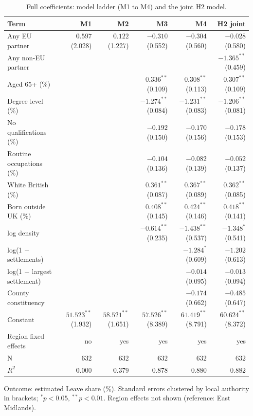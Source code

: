 \documentclass[11pt,a4paper]{article}
\begin{document}
\begin{table}[H]\centering\scriptsize\begin{threeparttable}\caption{Full coefficients: model ladder (M1 to M4) and the joint H2 model.}\label{tab:full}\begin{tabular}{lrrrrr}\toprule Term & M1 & M2 & M3 & M4 & H2 joint\\\midrule
Any EU partner & $0.597$ (2.028) & $0.122$ (1.227) & $-0.310$ (0.552) & $-0.304$ (0.560) & $-0.028$ (0.580)\\
Any non-EU partner &  &  &  &  & $-1.365^{**}$ (0.459)\\
Aged 65+ (\%) &  &  & $0.336^{**}$ (0.109) & $0.308^{**}$ (0.113) & $0.307^{**}$ (0.109)\\
Degree level (\%) &  &  & $-1.274^{**}$ (0.084) & $-1.231^{**}$ (0.083) & $-1.206^{**}$ (0.081)\\
No qualifications (\%) &  &  & $-0.192$ (0.150) & $-0.170$ (0.156) & $-0.178$ (0.153)\\
Routine occupations (\%) &  &  & $-0.104$ (0.136) & $-0.082$ (0.139) & $-0.052$ (0.137)\\
White British (\%) &  &  & $0.361^{**}$ (0.087) & $0.367^{**}$ (0.089) & $0.362^{**}$ (0.085)\\
Born outside UK (\%) &  &  & $0.408^{**}$ (0.145) & $0.424^{**}$ (0.146) & $0.418^{**}$ (0.141)\\
log density &  &  & $-0.614^{**}$ (0.235) & $-1.438^{**}$ (0.537) & $-1.348^{*}$ (0.541)\\
log(1 + settlements) &  &  &  & $-1.284^{*}$ (0.609) & $-1.202$ (0.613)\\
log(1 + largest settlement) &  &  &  & $-0.014$ (0.095) & $-0.013$ (0.094)\\
County constituency &  &  &  & $-0.174$ (0.662) & $-0.485$ (0.647)\\
Constant & $51.523^{**}$ (1.932) & $58.521^{**}$ (1.651) & $57.526^{**}$ (8.389) & $61.419^{**}$ (8.791) & $60.624^{**}$ (8.372)\\
\midrule Region fixed effects & no & yes & yes & yes & yes\\
N & 632 & 632 & 632 & 632 & 632\\
$R^2$ & 0.000 & 0.379 & 0.878 & 0.880 & 0.882\\
\bottomrule\end{tabular}\begin{tablenotes}\footnotesize\item Outcome: estimated Leave share (\%). Standard errors clustered by local authority in brackets; $^{*}p<0.05$, $^{**}p<0.01$. Region effects not shown (reference: East Midlands).\end{tablenotes}\end{threeparttable}\end{table}
\end{document}
